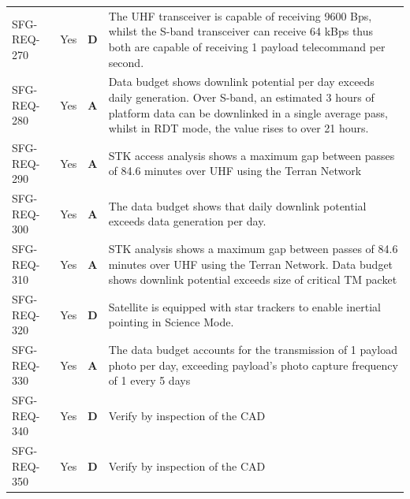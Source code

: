 \documentclass[a4paper, 11pt, conference]{IEEEtran}
\begin{document}
\begin{table}[H]
\begin{tabularx}{\textwidth}{l c c X}
SFG-REQ-270 & Yes & \textbf{D} & The UHF transceiver is capable of receiving 9600 Bps, whilst the S-band transceiver can receive 64 kBps thus both are capable of receiving 1 payload telecommand per second. \\
SFG-REQ-280 & Yes & \textbf{A} & Data budget shows downlink potential per day exceeds daily generation. Over S-band, an estimated 3 hours of platform data can be downlinked in a single average pass, whilst in RDT mode, the value rises to over 21 hours.\\
SFG-REQ-290 & Yes & \textbf{A} & STK access analysis shows a maximum gap between passes of 84.6 minutes over UHF using the Terran Network \\
SFG-REQ-300 & Yes & \textbf{A} & The data budget shows that daily downlink potential exceeds data generation per day. \\
SFG-REQ-310 & Yes & \textbf{A} & STK analysis shows a maximum gap between passes of 84.6 minutes over UHF using the Terran Network. Data budget shows downlink potential exceeds size of critical TM packet \\
SFG-REQ-320 & Yes & \textbf{D} & Satellite is equipped with star trackers to enable inertial pointing in Science Mode. \\
SFG-REQ-330 & Yes & \textbf{A} & The data budget accounts for the transmission of 1 payload photo per day, exceeding payload's photo capture frequency of 1 every 5 days \\
SFG-REQ-340 & Yes & \textbf{D} & Verify by inspection of the CAD \\
SFG-REQ-350 & Yes & \textbf{D} & Verify by inspection of the CAD \\

\bottomrule
\end{tabularx}
\end{table}
\end{document}
